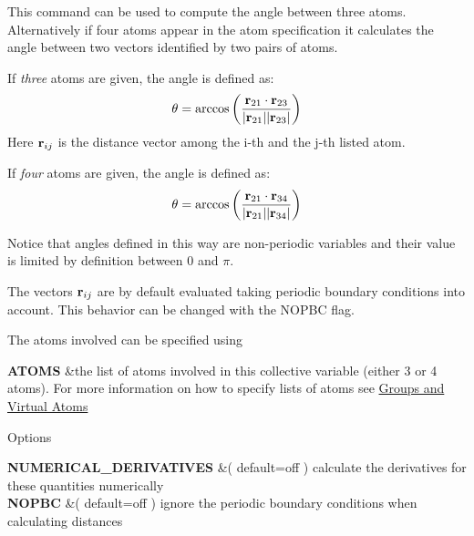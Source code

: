 This command can be used to compute the angle between three atoms. Alternatively if four atoms appear in the atom specification it calculates the angle between two vectors identified by two pairs of atoms.

If {\itshape three} atoms are given, the angle is defined as\+: \[ \theta=\arccos\left(\frac{ {\bf r}_{21}\cdot {\bf r}_{23}}{ |{\bf r}_{21}| |{\bf r}_{23}|}\right) \] Here $ {\bf r}_{ij}$ is the distance vector among the i-\/th and the j-\/th listed atom.

If {\itshape four} atoms are given, the angle is defined as\+: \[ \theta=\arccos\left(\frac{ {\bf r}_{21}\cdot {\bf r}_{34}}{ |{\bf r}_{21}| |{\bf r}_{34}|}\right) \]

Notice that angles defined in this way are non-\/periodic variables and their value is limited by definition between 0 and $\pi$.

The vectors $ {\bf r}_{ij}$ are by default evaluated taking periodic boundary conditions into account. This behavior can be changed with the N\+O\+P\+B\+C flag.

\begin{DoxyParagraph}{The atoms involved can be specified using}

\end{DoxyParagraph}
\begin{TabularC}{2}
\hline
{\bfseries  A\+T\+O\+M\+S } &the list of atoms involved in this collective variable (either 3 or 4 atoms). For more information on how to specify lists of atoms see \hyperlink{Group}{Groups and Virtual Atoms}   \\
\end{TabularC}


\begin{DoxyParagraph}{Options}

\end{DoxyParagraph}
\begin{TabularC}{2}
\hline
{\bfseries  N\+U\+M\+E\+R\+I\+C\+A\+L\+\_\+\+D\+E\+R\+I\+V\+A\+T\+I\+V\+E\+S } &( default=off ) calculate the derivatives for these quantities numerically   \\
{\bfseries  N\+O\+P\+B\+C } &( default=off ) ignore the periodic boundary conditions when calculating distances  

\\
\end{TabularC}


